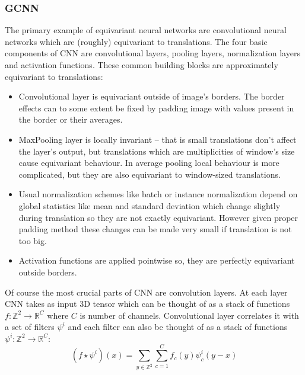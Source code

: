     \subsubsection{GCNN}
    The primary example of equivariant neural networks are convolutional neural
    networks which are (roughly) equivariant to translations. The four basic
    components of CNN are convolutional layers, pooling layers, normalization
    layers and activation functions.  These common building blocks are approximately
    equivariant to translations:
    \begin{itemize}
        \item Convolutional layer is
            equivariant outside of image's borders. The border effects can to
            some extent be fixed by padding image with values present in the
            border or their averages.
        \item MaxPooling layer is locally invariant -- that is small translations don't
            affect the layer's output, but translations which are multiplicities
            of window's size cause equivariant behaviour.
            In average pooling local behaviour is more
            complicated, but they are also equivariant to window-sized
            translations.
        \item Usual normalization schemes like batch or instance
            normalization depend on global statistics
            like mean and standard deviation which change slightly during
            translation so they are not exactly equivariant. However given
            proper padding method these changes can be made very small if
            translation is not too big.
        \item Activation functions are applied pointwise so, they are
            perfectly equivariant outside borders.
    \end{itemize}
    Of course the most crucial parts of CNN are convolution layers. At each
    layer CNN takes as input 3D tensor which can be thought of as a
    stack of functions $f:\mathbb{Z}^2\to\mathbb{R}^C$ where $C$ is number of channels.
    Convolutional layer correlates it with a set of filters $\psi^i$
    and each filter can also be thought of as a stack of functions
    $\psi^i:\mathbb{Z}^2\to\mathbb{R}^C$:
    \begin{equation}
        \label{eq:cnn}
        (f\star\psi^i)(x) = \sum_{y\in\mathbb{Z}^2}\sum_{c=1}^C
        f_c(y)\psi_{c}^{i}(y-x)
    \end{equation}

